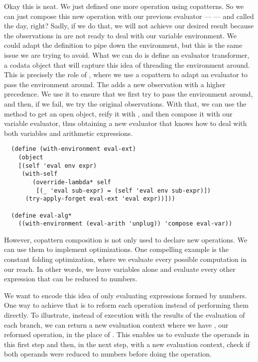 Okay this is neat.
We just defined one more operation using copatterns.
So we can just compose this new operation with our previous evaluator ---  --- and called the day, right?
Sadly, if we do that, we will not achieve our desired result because the observations in  are not ready to deal with our variable environment. 
We could adapt the  definition to pipe down the environment, but this is the same issue we are trying to avoid.
What we can do is define an evaluator transformer, a codata object that will capture this idea of threading the environment around.
This is precisely the role of , where we use a copattern to adapt an evaluator to pass the environment around.
The  adds a new observation with a higher precedence.
We use it to ensure that we first try to pass the environment around, and then, if we fail, we try the original observations.
With that, we can use the  method to get an open object, reify it with , and then compose it with our variable evaluator, thus obtaining a new evaluator that knows how to deal with both variables and arithmetic expressions.

\begin{verbatim}
  (define (with-environment eval-ext)
    (object
    [(self 'eval env expr)
     (with-self
        (override-lambda* self
         [(_ 'eval sub-expr) = (self 'eval env sub-expr)])
      (try-apply-forget eval-ext 'eval expr))]))

  (define eval-alg*
    ((with-environment (eval-arith 'unplug)) 'compose eval-var))
\end{verbatim}

However, copattern composition is not only used to declare new operations.
We can use them to implement optimizations.
One compelling example is the constant folding optimization, where we evaluate every possible computation in our reach.
In other words, we leave variables alone and evaluate every other expression that can be reduced to numbers.

We want to encode this idea of only evaluating expressions formed by numbers.
One way to achieve that is to reform each operation instead of performing them directly.
To illustrate, instead of execution \scm{+} with the results of the evaluation of each branch, we can return a new evaluation context where we have , our reformed operation, in the place of .
This enables us to evaluate the operands in this first step and then, in the next step, with a new evaluation context, check if both operands were reduced to numbers before doing the operation.

